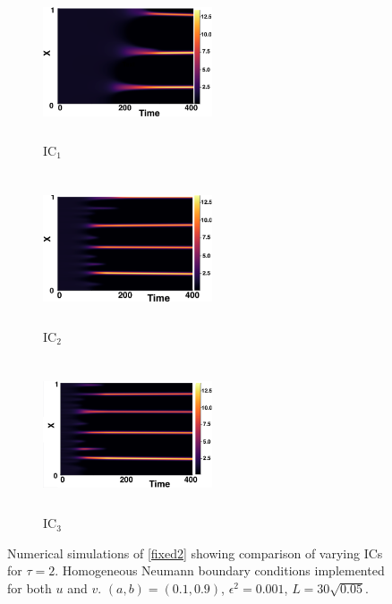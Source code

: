 \begin{figure}[H]
    \centering
    \begin{subfigure}[b]{0.32\textwidth}
        \centering
        \includegraphics[width=5cm,height=4.5cm]{gaff2.png}
        \caption{$\text{IC}_1$}
        \label{}
    \end{subfigure}
    \hfill
    \begin{subfigure}[b]{0.32\textwidth}
        \centering
        \includegraphics[width=5cm,height=4.5cm]{ic22.png}
        \caption{$\text{IC}_2$}
        \label{}
    \end{subfigure}
    \hfill
    \begin{subfigure}[b]{0.32\textwidth}
        \centering
        \includegraphics[width=5cm,height=4.5cm]{ic32.png}
        \caption{$\text{IC}_3$}
        \label{}
    \end{subfigure}
    \caption{Numerical simulations of \eqref{fixed2} showing comparison of varying ICs for $\tau=2$. Homogeneous Neumann boundary conditions implemented for both $u$ and $v$. $(a,b)=(0.1,0.9)$, $\epsilon^2=0.001$, $L=30\sqrt{0.05}$.}
    \label{fig:figtau2}
\end{figure}
